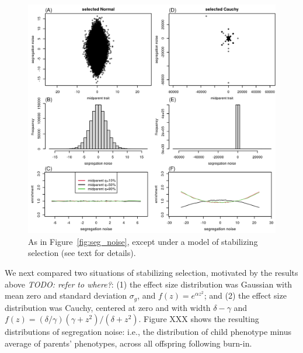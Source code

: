 \documentclass{article}
\newcommand{\comment}[1]{{\color{blue} \it #1}}
\theoremstyle{remark}
\theoremstyle{definition}
\begin{document}
\begin{figure}
    \begin{center}
        \includegraphics{sims/selected_seg_noise}
    \end{center}
    \caption{
        As in Figure~\ref{fig:seg_noise},
        except under a model of stabilizing selection (see text for details).
        \label{fig:sel_seg_noise}
    }
\end{figure}

We next compared two situations of stabilizing selection, motivated by the results above
\comment{TODO: refer to where?}:
(1) the effect size distribution was Gaussian with mean zero and standard deviation $\sigma_g$,
and $f(z) = e^{\alpha z^2}$; and
(2) the effect size distribution was Cauchy, centered at zero and with width $\delta - \gamma$
and $f(z) = (\delta/\gamma) (\gamma + z^2) / (\delta + z^2)$.
Figure XXX shows the resulting distributions of segregation noise:
i.e., the distribution of child phenotype minus average of parents' phenotypes,
across all offspring following burn-in.







\appendix
\end{document}
